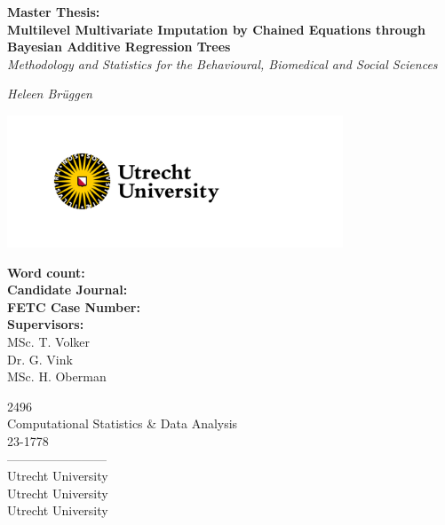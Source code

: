 \documentclass[10pt, a4paper, titlepage]{article}
\begin{document}
\begin{titlingpage}
\begin{center}
\Huge\textbf{Master Thesis:  \\ Multilevel Multivariate Imputation by Chained Equations through Bayesian Additive Regression Trees} \\
\Large\textit{Methodology and Statistics for the Behavioural, Biomedical and Social Sciences}

\vspace{.5cm}

\normalsize\textit{Heleen Brüggen}

\vspace{11.5cm}

\begin{minipage}{.5\textwidth}
\begin{center}
        \includegraphics[width=10cm]{graphs/UU_logo_2021_EN_RGB.png}
\end{center}
\end{minipage}%

\vspace{.25cm}

\begin{minipage}{0.5\textwidth}
\begin{flushleft}

\textbf{Word count:} \\
\textbf{Candidate Journal:} \\
\textbf{FETC Case Number:} \\
\textbf{Supervisors:} \\
MSc. T. Volker \\
Dr. G. Vink \\
MSc. H. Oberman
\end{flushleft}
\end{minipage}%
\begin{minipage}{0.5\textwidth}
\begin{flushright}

2496 \\
Computational Statistics \& Data Analysis \\
23-1778 \\
------------------------\\
Utrecht University \\
Utrecht University \\
Utrecht University
\end{flushright}
\end{minipage}

\end{center}
\end{titlingpage}
\end{document}
